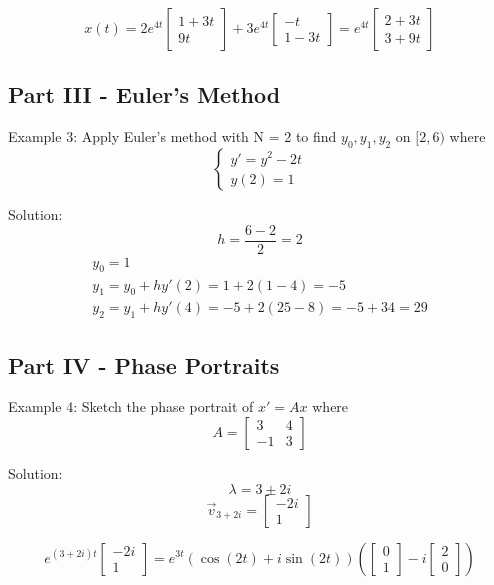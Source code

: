 \documentclass[12pt]{article}
\begin{document}
\[x(t) = 2e^{4t}  \begin{bmatrix}
    1 + 3t\\
    9t
\end{bmatrix} + 3e^{4t} \begin{bmatrix}
    -t\\
    1 - 3t
\end{bmatrix} = \boxed{e^{4t} \begin{bmatrix}
    2 + 3t\\
    3 + 9t
\end{bmatrix}}\]

\subsection*{Part III - Euler's Method}
Example 3: Apply Euler's method with N = 2 to find $y_0, y_1, y_2$ on $[2, 6)$ where
\[\begin{cases}
    y' = y^2 - 2t\\
    y(2) = 1
\end{cases}\]

Solution:
\[h = \frac{6 - 2}{2} = 2\]
\begin{align*}
    y_0 = 1\\
    y_1 = y_0 + h y'(2) = 1 + 2 (1 - 4) = -5\\
    y_2 = y_1 + h y'(4) = -5 + 2 (25 - 8) = -5 + 34 = 29
\end{align*}

\subsection*{Part IV - Phase Portraits}
Example 4: Sketch the phase portrait of $x' = Ax$ where
\[A = \begin{bmatrix}
    3 & 4\\
    -1 & 3
\end{bmatrix}\]

Solution:
\[\lambda = 3 \pm 2i\]
\[\vec{v}_{3 + 2i} = \begin{bmatrix}
    -2i\\
    1
\end{bmatrix}\] 

\[e^{(3 + 2i)t} \begin{bmatrix}
    -2i\\
    1
\end{bmatrix} = e^{3t} \left(\cos (2t) + i \sin (2t)\right) \left(\begin{bmatrix}
    0\\
    1
\end{bmatrix} - i \begin{bmatrix}
    2\\0
\end{bmatrix}\right)\]
\end{document}
